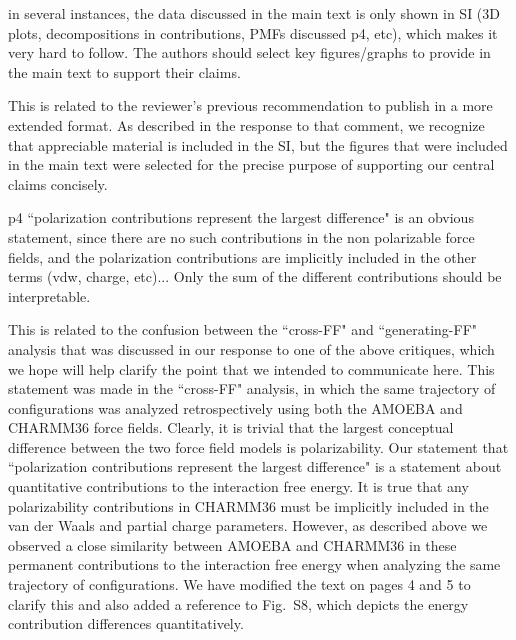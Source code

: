 \documentclass[answers,12pt]{exam}
\begin{document}
\begin{questions}
\begin{solution}
    \end{solution}
 
    \question in several instances, the data discussed in the main text is only shown in SI (3D plots, decompositions in contributions, PMFs discussed p4, etc), which makes it very hard to follow. The authors should select key figures/graphs to provide in the main text to support their claims.
    \begin{solution}
    This is related to the reviewer’s previous recommendation to publish in a more extended format. As described in the response to that comment, we recognize that appreciable material is included in the SI, but the figures that were included in the main text were selected for the precise purpose of supporting our central claims concisely.  
    \end{solution}
 
    \question p4 ``polarization contributions represent the largest difference" is an obvious statement, since there are no such contributions in the non polarizable force fields, and the polarization contributions are implicitly included in the other terms (vdw, charge, etc)... Only the sum of the different contributions should be interpretable.
    \begin{solution}
    This is related to the confusion between the ``cross-FF" and ``generating-FF" analysis that was discussed in our response to one of the above critiques, which we hope will help clarify the point that we intended to communicate here. This statement was made in the ``cross-FF" analysis, in which the same trajectory of configurations was analyzed retrospectively using both the AMOEBA and CHARMM36 force fields. Clearly, it is trivial that the largest conceptual difference between the two force field models is polarizability. Our statement that ``polarization contributions represent the largest difference" is a statement about quantitative contributions to the interaction free energy. It is true that any polarizability contributions in CHARMM36 must be implicitly included in the van der Waals and partial charge parameters. However, as described above we observed a close similarity between AMOEBA and CHARMM36 in these permanent contributions to the interaction free energy when analyzing the same trajectory of configurations. We have modified the text on pages 4 and 5 to clarify this and also added a reference to Fig.~S8, which depicts the energy contribution differences quantitatively.
    \end{solution}
 

\end{questions}
\end{document}
